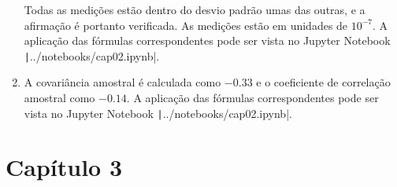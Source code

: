 \begin{enumerate}[label=\textbf{2.\arabic*.}]
	Todas as medições estão dentro do desvio padrão umas das outras, e a afirmação é portanto verificada. As medições estão em unidades de $10^{-7}$. A aplicação das fórmulas correspondentes pode ser vista no Jupyter Notebook \texttt|../notebooks/cap02.ipynb|.
	
	\item A covariância amostral é calculada como $-0.33$ e o coeficiente de correlação amostral como $-0.14$. A aplicação das fórmulas correspondentes pode ser vista no Jupyter Notebook \texttt|../notebooks/cap02.ipynb|. 
\end{enumerate}

\section*{Capítulo 3}


